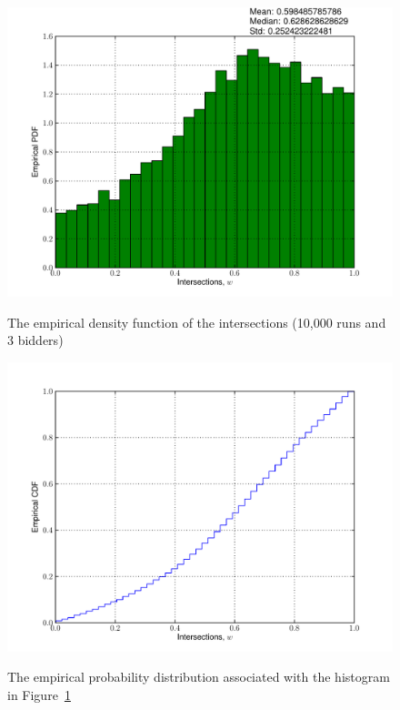 \begin{figure}[htp]
	\caption{The empirical density function of the intersections (10,000 runs and 3 bidders)}
	\vspace{0.5cm}
	\includegraphics[width=\figsize]{2/Figures/hist_N_3}
	\label{fig:hist_N_3}
\end{figure}

\begin{figure}[hbp]
	\caption{The empirical probability distribution associated with the histogram in Figure~\ref{fig:hist_N_3}}
	\includegraphics[width=\figsize]{2/Figures/ecdf_N_3}
	\label{fig:ecdf_N_3}
\end{figure}

